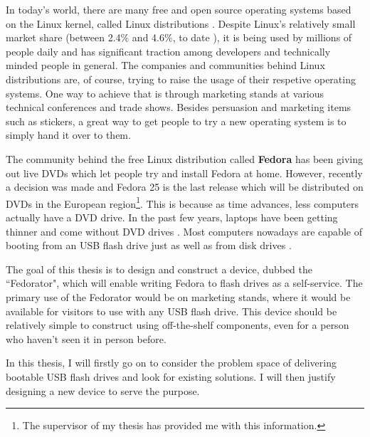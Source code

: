 \label{Introduction}
    In today's world, there are many free and open source operating systems based on the Linux kernel, called Linux distributions \cite{whatislinux}.  Despite Linux's relatively small market share (between 2.4\% and 4.6\%, to date \cite{linuxmarketshare}), it is being used by millions of people daily and has significant traction among developers \cite{sosurvey} and technically minded people in general.  The companies and communities behind Linux distributions are, of course, trying to raise the usage of their respetive operating systems.  One way to achieve that is through marketing stands at various technical conferences and trade shows.  Besides persuasion and marketing items such as stickers, a great way to get people to try a new operating system is to simply hand it over to them.

    The community behind the free Linux distribution called \textbf{Fedora} \cite{fedora} has been giving out live DVDs which let people try and install Fedora at home.  However, recently a decision was made and Fedora 25 is the last release which will be distributed on DVDs in the European region\footnote{The supervisor of my thesis has provided me with this information.}.  This is because as time advances, less computers actually have a DVD drive.  In the past few years, laptops have been getting thinner and come without DVD drives \cite{laptopdvd}.  Most computers nowadays are capable of booting from an USB flash drive just as well as from disk drives \cite{fedora-how-to-live-usb}.
    
    The goal of this thesis is to design and construct a device, dubbed the ``Fedorator", which will enable writing Fedora to flash drives as a self-service.  The primary use of the Fedorator would be on marketing stands, where it would be available for visitors to use with any USB flash drive.  This device should be relatively simple to construct using off-the-shelf components, even for a person who haven't seen it in person before.
    
    In this thesis, I will firstly go on to consider the problem space of delivering bootable USB flash drives and look for existing solutions.  I will then justify designing a new device to serve the purpose.
